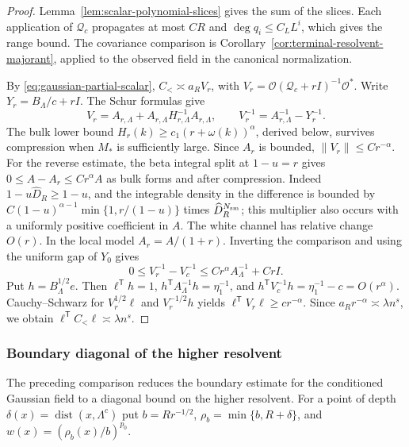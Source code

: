 \documentclass[11pt]{article}
\theoremstyle{definition}
\begin{document}
\begin{proof}
Lemma~\ref{lem:scalar-polynomial-slices} gives the sum of the slices.
Each application of \(\mathcal Q_c\) propagates at most \(CR\) and
\(\deg q_i\le C_LL^i\), which gives the range bound. The covariance
comparison is Corollary~\ref{cor:terminal-resolvent-majorant},
applied to the observed field in the canonical normalization.

By \eqref{eq:gaussian-partial-scalar}, \(C_<\asymp a_R V_r\), with
\(V_r=\mathcal O(\mathcal Q_c+rI)^{-1}\mathcal O^*\).
Write \(Y_r=B_\Lambda/c+rI\). The Schur formulas give
\begin{equation}
 V_r=A_{r,\Lambda}+A_{r,\Lambda}H_{r,\Lambda}^{-1}A_{r,\Lambda},
 \qquad V_r^{-1}=A_{r,\Lambda}^{-1}-Y_r^{-1}.
\end{equation}
The bulk lower bound \(H_r(k)\ge c_1(r+\omega(k))^\alpha\), derived
below, survives compression when \(M_*\) is sufficiently large. Since
\(A_r\) is bounded, \(\|V_r\|\le C r^{-\alpha}\). For the reverse
estimate, the beta integral split at \(1-u=r\) gives
\(0\le A-A_r\le Cr^\alpha A\) as bulk forms and after compression.
Indeed \(1-u\widehat D_R\ge1-u\), and the integrable density in the
difference is bounded by
\(C(1-u)^{\alpha-1}\min\{1,r/(1-u)\}\) times
\(\widehat D_R^{N_{\rm sm}}\); this multiplier also occurs with a
uniformly positive coefficient in \(A\). The white channel has
relative change \(O(r)\). In the local model \(A_r=A/(1+r)\).
Inverting the comparison and using the uniform gap of \(Y_0\) gives
\begin{equation}
 0\le V_r^{-1}-V_c^{-1}\le
 Cr^\alpha A_\Lambda^{-1}+Cr I .
\end{equation}
Put \(h=B_\Lambda^{1/2}e\). Then \(\ell^{\mathsf T}h=1\),
\(h^{\mathsf T}A_\Lambda^{-1}h=\eta_1^{-1}\), and
\(h^{\mathsf T}V_c^{-1}h=\eta_1^{-1}-c=O(r^\alpha)\).
Cauchy--Schwarz for \(V_r^{1/2}\ell\) and \(V_r^{-1/2}h\)
yields \(\ell^{\mathsf T}V_r\ell\ge c r^{-\alpha}\).
Since \(a_R r^{-\alpha}\asymp\lambda n^s\), we obtain
\(\ell^{\mathsf T}C_<\ell\asymp\lambda n^s\).
\end{proof}

\subsubsection{Boundary diagonal of the higher resolvent}
The preceding comparison reduces the boundary estimate for the
conditioned Gaussian field to a diagonal bound on the higher
resolvent. For a point of depth \(\delta(x)=\operatorname{dist}(x,\Lambda^c)\)
put \(b=Rr^{-1/2}\), \(\rho_b=\min\{b,R+\delta\}\), and
\(w(x)=(\rho_b(x)/b)^{p_0}\).
\end{document}
